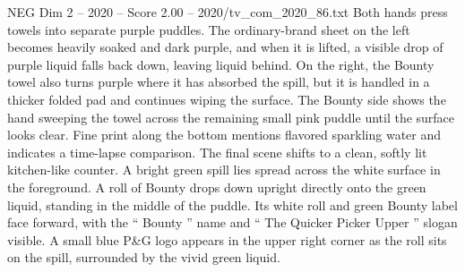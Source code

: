 \begin{textsample}{NEG Dim 2 – 2020 – Score 2.00 – 2020/tv\_com\_2020\_86.txt}
Both hands press towels into separate purple puddles.
The ordinary-brand sheet on the left becomes heavily soaked and dark purple, and when it is lifted, a visible drop of purple liquid falls back down, leaving liquid behind.
On the right, the Bounty towel also turns purple where it has absorbed the spill, but it is handled in a thicker folded pad and continues wiping the surface.
The Bounty side shows the hand sweeping the towel across the remaining small pink puddle until the surface looks clear.
Fine print along the bottom mentions flavored sparkling water and indicates a time-lapse comparison.
The final scene shifts to a clean, softly lit kitchen-like counter.
A bright green spill lies spread across the white surface in the foreground.
A roll of Bounty drops down upright directly onto the green liquid, standing in the middle of the puddle.
Its white roll and green Bounty label face forward, with the “ Bounty ” name and “ The Quicker Picker Upper ” slogan visible.
A small blue P\&G logo appears in the upper right corner as the roll sits on the spill, surrounded by the vivid green liquid.

\end{textsample}
